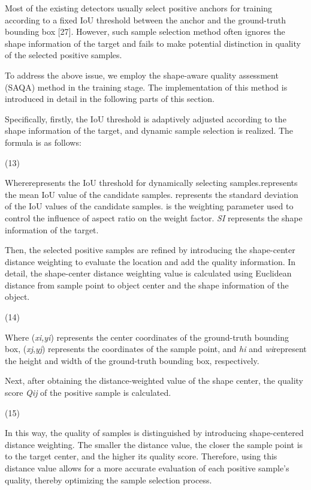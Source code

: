 \documentclass[10pt,twocolumn,final]{article}
\begin{document}
Most of the existing detectors usually select positive anchors for training according to a fixed IoU threshold between the anchor and the ground-truth bounding box [27]. However, such sample selection method often ignores the shape information of the target and fails to make potential distinction in quality of the selected positive samples.

To address the above issue, we employ the shape-aware quality assessment (SAQA) method in the training stage. The implementation of this method is introduced in detail in the following parts of this section.

Specifically, firstly, the IoU threshold is adaptively adjusted according to the shape information of the target, and dynamic sample selection is realized. The formula is as follows:

(13)

Whererepresents the IoU threshold for dynamically selecting samples.represents the mean IoU value of the candidate samples. represents the standard deviation of the IoU values of the candidate samples.  is the weighting parameter used to control the influence of aspect ratio on the weight factor. \textit{SI} represents the shape information of the target.

Then, the selected positive samples are refined by introducing the shape-center distance weighting to evaluate the location and add the quality information. In detail, the shape-center distance weighting value  is calculated using Euclidean distance from sample point to object center and the shape information of the object.

(14)

Where (\textit{x}\textit{i}\textit{,y}\textit{i}) represents the center coordinates of the ground-truth bounding box, (\textit{x}\textit{j}​,\textit{y}\textit{j}​) represents the coordinates of the sample point, and \textit{h}\textit{i}​ and \textit{w}\textit{i}​ represent the height and width of the ground-truth bounding box, respectively.

Next, after obtaining the distance-weighted value of the shape center, the quality score \textit{Q}\textit{ij }of the positive sample is calculated.

(15)

In this way, the quality of samples is distinguished by introducing shape-centered distance weighting. The smaller the distance value, the closer the sample point is to the target center, and the higher its quality score. Therefore, using this distance value allows for a more accurate evaluation of each positive sample's quality, thereby optimizing the sample selection process.
\end{document}
